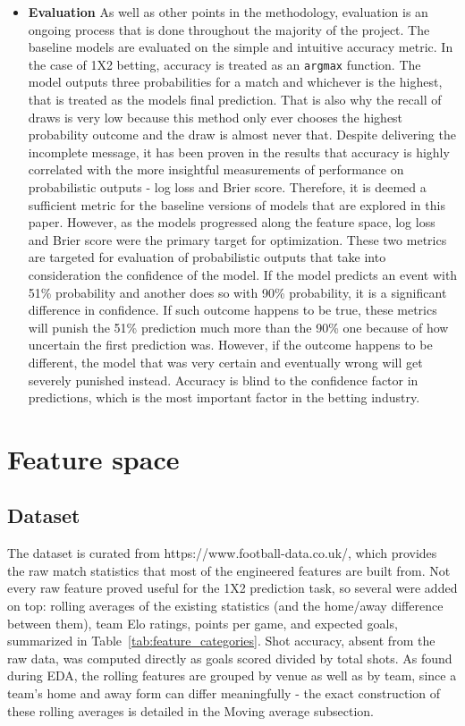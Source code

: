 \documentclass{article}
\begin{document}
\begin{itemize}
    \item \textbf{Evaluation} As well as other points in the methodology, evaluation is an ongoing process that is done throughout the majority of the project. The baseline models are evaluated on the simple and intuitive accuracy metric. In the case of 1X2 betting, accuracy is treated as an \texttt{argmax} function. The model outputs three probabilities for a match and whichever is the highest, that is treated as the models final prediction. That is also why the recall of draws is very low because this method only ever chooses the highest probability outcome and the draw is almost never that. Despite delivering the incomplete message, it has been proven in the results that accuracy is highly correlated with the more insightful measurements of performance on probabilistic outputs - log loss and Brier score. Therefore, it is deemed a sufficient metric for the baseline versions of models that are explored in this paper. However, as the models progressed along the feature space, log loss and Brier score were the primary target for optimization. These two metrics are targeted for evaluation of probabilistic outputs that take into consideration the confidence of the model. If the model predicts an event with 51\% probability and another does so with 90\% probability, it is a significant difference in confidence. If such outcome happens to be true, these metrics will punish the 51\% prediction much more than the 90\% one because of how uncertain the first prediction was. However, if the outcome happens to be different, the model that was very certain and eventually wrong will get severely punished instead. Accuracy is blind to the confidence factor in predictions, which is the most important factor in the betting industry.
    
\end{itemize}

\section{Feature space}
\subsection{Dataset}
The dataset is curated from https://www.football-data.co.uk/, which provides the raw match statistics that most of the engineered features are built from. Not every raw feature proved useful for the 1X2 prediction task, so several were added on top: rolling averages of the existing statistics (and the home/away difference between them), team Elo ratings, points per game, and expected goals, summarized in Table~\ref{tab:feature_categories}. Shot accuracy, absent from the raw data, was computed directly as goals scored divided by total shots. As found during EDA, the rolling features are grouped by venue as well as by team, since a team's home and away form can differ meaningfully - the exact construction of these rolling averages is detailed in the Moving average subsection.
\end{document}
